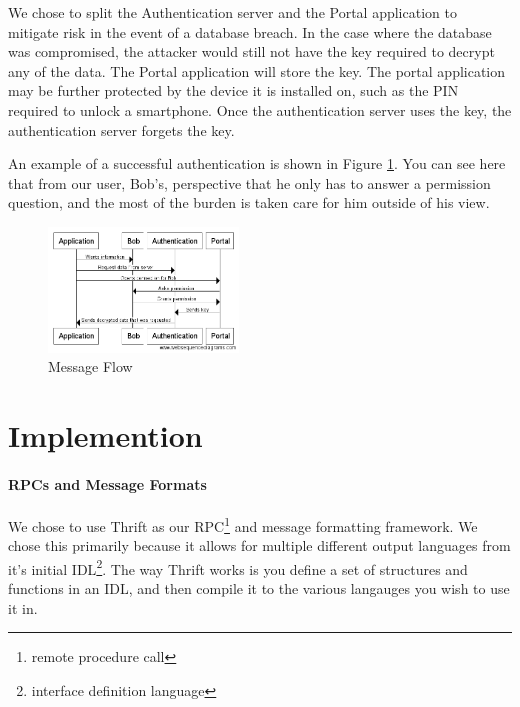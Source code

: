 \documentclass[letterpaper,twocolumn,10pt]{article}
\begin{document}
We chose to split the Authentication server and the Portal application to mitigate risk in the event of a database breach. In the case where the database was compromised, the attacker would still not have the key required to decrypt any of the data. The Portal application will store the key. The portal application may be further protected by the device it is installed on, such as the PIN required to unlock a smartphone. Once the authentication server uses the key, the authentication server forgets the key.


An example of a successful authentication is shown in Figure \ref{messageflow}. You can see here that from our user, Bob's, perspective that he only has to answer a permission question, and the most of the burden is taken care for him outside of his view.

\begin{figure}[ht]
\includegraphics[width=0.45\textwidth]{messageDiagram}
\caption{Message Flow}
\label{messageflow}
\end{figure}

\section{Implemention}

\paragraph{RPCs and Message Formats}
    We chose to use Thrift\cite{thrift} as our RPC\footnote{remote procedure call} and message formatting framework. We chose this primarily because it allows for multiple different output languages from it's initial IDL\footnote{interface definition language}. The way Thrift works is you define a set of structures and functions in an IDL, and then compile it to the various langauges you wish to use it in. 
    
\end{document}
